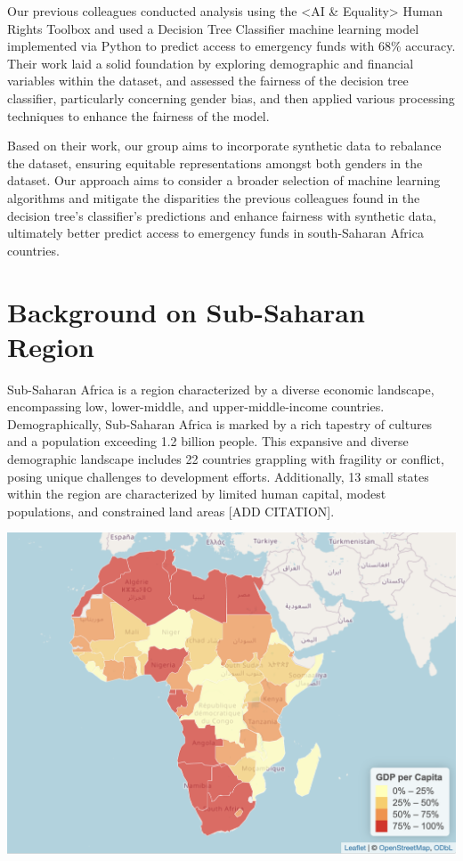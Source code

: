 \documentclass[12pt]{article}
\begin{document}
Our previous colleagues conducted analysis using the \textless AI \&
Equality\textgreater{} Human Rights Toolbox and used a Decision Tree
Classifier machine learning model implemented via Python to predict
access to emergency funds with 68\% accuracy. Their work laid a solid
foundation by exploring demographic and financial variables within the
dataset, and assessed the fairness of the decision tree classifier,
particularly concerning gender bias, and then applied various processing
techniques to enhance the fairness of the model\citep{Porta2022}.

Based on their work, our group aims to incorporate synthetic data to
rebalance the dataset, ensuring equitable representations amongst both
genders in the dataset. Our approach aims to consider a broader
selection of machine learning algorithms and mitigate the disparities
the previous colleagues found in the decision tree's classifier's
predictions and enhance fairness with synthetic data, ultimately better
predict access to emergency funds in south-Saharan Africa
countries\citep{SyntheticDataAIEquality}.

\hypertarget{background-on-sub-saharan-region}{%
\section{Background on Sub-Saharan
Region}\label{background-on-sub-saharan-region}}

Sub-Saharan Africa is a region characterized by a diverse economic
landscape, encompassing low, lower-middle, and upper-middle-income
countries. Demographically, Sub-Saharan Africa is marked by a rich
tapestry of cultures and a population exceeding 1.2 billion people. This
expansive and diverse demographic landscape includes 22 countries
grappling with fragility or conflict, posing unique challenges to
development efforts. Additionally, 13 small states within the region are
characterized by limited human capital, modest populations, and
constrained land areas {[}ADD CITATION{]}.

\begin{center}\includegraphics[width=0.7\linewidth]{graphs/map} \end{center}
\end{document}
